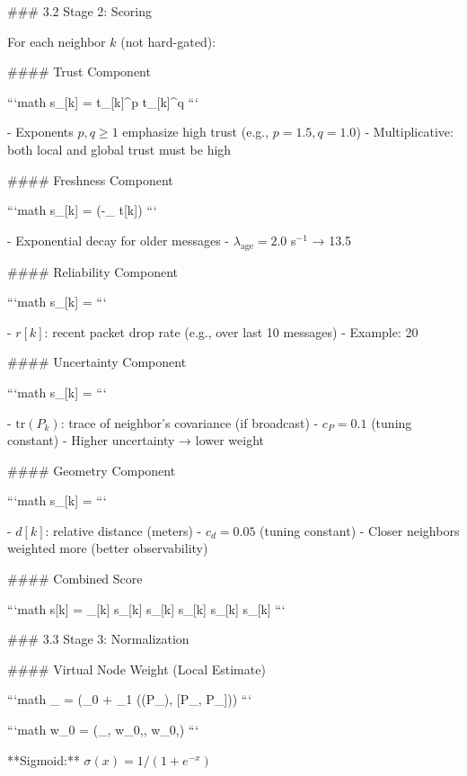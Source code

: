 ### 3.2 Stage 2: Scoring

For each neighbor \(k\) (not hard-gated):

#### Trust Component

```math
s_{}[k] = t_{}[k]^p \cdot t_{}[k]^q
```

- Exponents \(p, q \geq 1\) emphasize high trust (e.g., \(p=1.5, q=1.0\))
- Multiplicative: both local and global trust must be high

#### Freshness Component

```math
s_{}[k] = \exp(-\lambda_{} \cdot \Delta t[k])
```

- Exponential decay for older messages
- \(\lambda_{\text{age}} = 2.0\) s\(^{-1}\) → 13.5%

#### Reliability Component

```math
s_{}[k] = 
```

- \(r[k]\): recent packet drop rate (e.g., over last 10 messages)
- Example: 20%

#### Uncertainty Component

```math
s_{}[k] = 
```

- \(\text{tr}(P_k)\): trace of neighbor's covariance (if broadcast)
- \(c_P = 0.1\) (tuning constant)
- Higher uncertainty → lower weight

#### Geometry Component

```math
s_{}[k] = 
```

- \(d[k]\): relative distance (meters)
- \(c_d = 0.05\) (tuning constant)
- Closer neighbors weighted more (better observability)

#### Combined Score

```math
s[k] = \alpha_{}[k] \cdot s_{}[k] \cdot s_{}[k] \cdot s_{}[k] \cdot s_{}[k] \cdot s_{}[k]
```

### 3.3 Stage 3: Normalization

#### Virtual Node Weight (Local Estimate)

```math
\alpha_{} = \sigma(\alpha_0 + \alpha_1 \cdot {}((P_{}), [P_{}, P_{}]))
```

```math
w_0 = (\alpha_{}, w_{0,\min}, w_{0,\max})
```

**Sigmoid:** \(\sigma(x) = 1/(1 + e^{-x})\)

